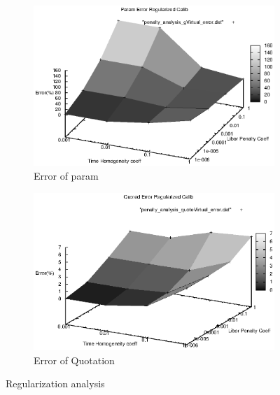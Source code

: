 \documentclass[a4paper,10pt]{article}
\begin{document}
\begin{figure}[h]
\begin{subfigure}{.5\textwidth}
  \centering
  \includegraphics[scale=0.5]{penalty_analysis_gVirtual_error}
  \caption{Error of param}
  \label{fig:regularized_param}
\end{subfigure}%
\begin{subfigure}{.5\textwidth}
  \centering
  \includegraphics[scale=0.5]{penalty_analysis_quoteVirtual_error}
  \caption{Error of Quotation}
  \label{fig:regularized_quotation}
\end{subfigure}
\caption{Regularization analysis}
\label{fig:regularization_analysis}
\end{figure}
\end{document}
